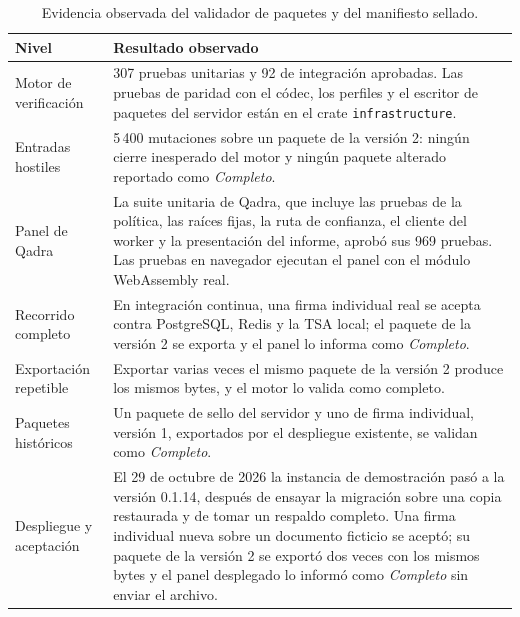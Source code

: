 \begin{table}[!htbp]
  \centering
  \caption{Evidencia observada del validador de paquetes y del manifiesto sellado.}
  \label{tab:pruebas-validador}
  
  \begin{tabularx}{\linewidth}{@{}L{3.3cm} X@{}}
    \toprule
    \textbf{Nivel} & \textbf{Resultado observado} \\
    \midrule
    Motor de verificación & 307 pruebas unitarias y 92 de integración aprobadas. Las pruebas de paridad con el códec, los perfiles y el escritor de paquetes del servidor están en el crate \texttt{infrastructure}. \\
    \addlinespace
    Entradas hostiles & 5\,400 mutaciones sobre un paquete de la versión 2: ningún cierre inesperado del motor y ningún paquete alterado reportado como \emph{Completo}. \\
    \addlinespace
    Panel de Qadra & La suite unitaria de Qadra, que incluye las pruebas de la política, las raíces fijas, la ruta de confianza, el cliente del worker y la presentación del informe, aprobó sus 969 pruebas. Las pruebas en navegador ejecutan el panel con el módulo WebAssembly real. \\
    \addlinespace
    Recorrido completo & En integración continua, una firma individual real se acepta contra PostgreSQL, Redis y la TSA local; el paquete de la versión 2 se exporta y el panel lo informa como \emph{Completo}. \\
    \addlinespace
    Exportación repetible & Exportar varias veces el mismo paquete de la versión 2 produce los mismos bytes, y el motor lo valida como completo. \\
    \addlinespace
    Paquetes históricos & Un paquete de sello del servidor y uno de firma individual, versión 1, exportados por el despliegue existente, se validan como \emph{Completo}. \\
    \addlinespace
    Despliegue y aceptación & El 29 de octubre de 2026 la instancia de demostración pasó a la versión 0.1.14, después de ensayar la migración sobre una copia restaurada y de tomar un respaldo completo. Una firma individual nueva sobre un documento ficticio se aceptó; su paquete de la versión 2 se exportó dos veces con los mismos bytes y el panel desplegado lo informó como \emph{Completo} sin enviar el archivo. \\
    \bottomrule
  \end{tabularx}
\end{table}


